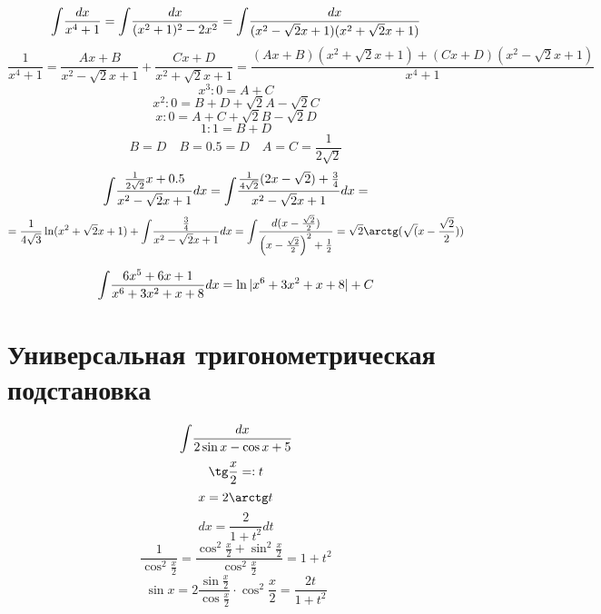$$\int\!\frac{dx}{x^4+1}=\int\!\frac{dx}{(x^2+1)^2-2x^2}=\int\!\frac{dx}{(x^2-\sqrt 2x+1)(x^2+\sqrt 2x+1)}$$
$$\frac{1}{x^4+1}=\frac{Ax+B}{x^2-\sqrt 2 x + 1}+\frac{Cx+D}{x^2+\sqrt 2 x + 1}=\frac{(Ax+B)(x^2+\sqrt 2 x + 1)+(Cx+D)(x^2-\sqrt 2 x + 1)}{x^4+1}$$
$$x^3:0=A+C$$
$$x^2:0=B+D+\sqrt 2A-\sqrt 2C$$
$$x:0=A+C+\sqrt2B-\sqrt2D$$
$$1:1=B+D$$
$$B=D \quad B=0.5=D \quad A=C=\frac{1}{2\sqrt 2}$$
$$\int\!\frac{\frac{1}{2\sqrt 2}x+0.5}{x^2-\sqrt 2x+1}dx=\int\!\frac{\frac{1}{4\sqrt 2}(2x-\sqrt 2)+\frac{3}{4}}{x^2-\sqrt 2 x + 1}dx=$$
$$=\frac{1}{4\sqrt 3}\ln(x^2+\sqrt 2 x + 1)+\intt\frac{\frac{3}{4}}{x^2-\sqrt 2 x + 1}dx=\intt\frac{d(x-\frac{\sqrt 2}{2})}{\left(x-\frac{\sqrt2}{2}\right)^2+\frac{1}{2}}=\sqrt 2 \arctg (\sqrt (x-\frac{\sqrt 2}{2}))$$

$$\int\!\frac{6x^5+6x+1}{x^6+3x^2+x+8}dx=\ln|x^6+3x^2+x+8|+C$$

\section{Универсальная тригонометрическая подстановка}

$$\int\!\frac{dx}{2\sin x - \cos x + 5}$$
$$\tg\frac{x}{2}=:t$$
$$x=2\arctg t$$
$$dx = \frac{2}{1+t^2}dt$$
$$\frac{1}{\cos^2\frac{x}{2}}=\frac{\cos^2\frac{x}{2}+\sin^2\frac{x}{2}}{\cos^2\frac{x}{2}}=1+t^2$$
$$\sin x = 2\frac{\sin\frac{x}{2}}{\cos\frac{x}{2}}\cdot \cos^2\frac{x}{2}=\frac{2t}{1+t^2}$$

